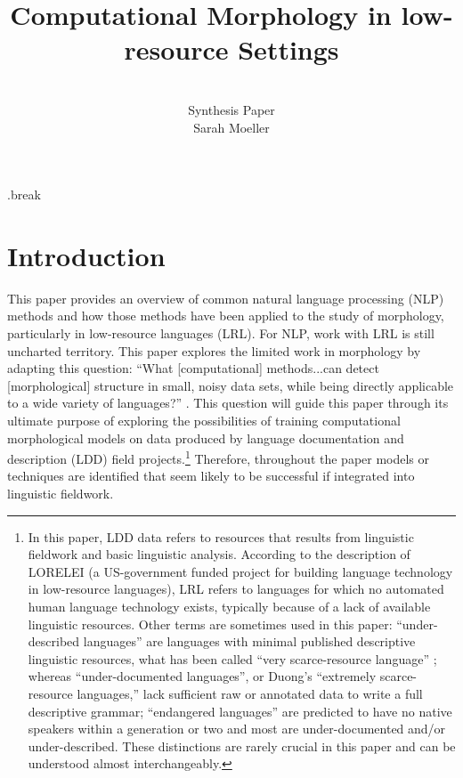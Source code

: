 \documentclass[12pt]{article}
\title{Computational Morphology in low-resource Settings}
\author{\\Synthesis Paper \\ Sarah Moeller}
\date{}
\begin{document}
\maketitle

\begin{singlespace}
\tableofcontents
\end{singlespace}

\p.break

\section{Introduction}
\label{sec:intro}

This paper provides an overview of common natural language processing (NLP) methods and how those methods have been applied to the study of morphology, particularly in low-resource languages (LRL). For NLP, work with LRL is still uncharted territory. This paper explores the limited work in morphology by adapting this question: ``What [computational] methods...can detect [morphological] structure in small, noisy data sets, while being directly applicable to a wide variety of languages?'' \cite{bird_natural_2009}. This question will guide this paper through its ultimate purpose of exploring the possibilities of training computational morphological models on data produced by language documentation and description (LDD) field projects.\footnote{In this paper, LDD data refers to resources that results from linguistic fieldwork and basic linguistic analysis. According to the description of LORELEI (a US-government funded project for building language technology in low-resource languages), LRL refers to languages for which no automated human language technology exists, typically because of a lack of available linguistic resources. Other terms are sometimes used in this paper: ``under-described languages'' are languages with minimal published descriptive linguistic resources, what has been called ``very scarce-resource language'' \cite{duong_natural_2017}; whereas ``under-documented languages'', or Duong's ``extremely scarce-resource languages,'' lack sufficient raw or annotated data to write a full descriptive grammar; ``endangered languages'' are predicted to have no native speakers within a generation or two and most are under-documented and/or under-described. These distinctions are rarely crucial in this paper and can be understood almost interchangeably.} Therefore, throughout the paper models or techniques are identified that seem likely to be successful if integrated into linguistic fieldwork.
\end{document}
